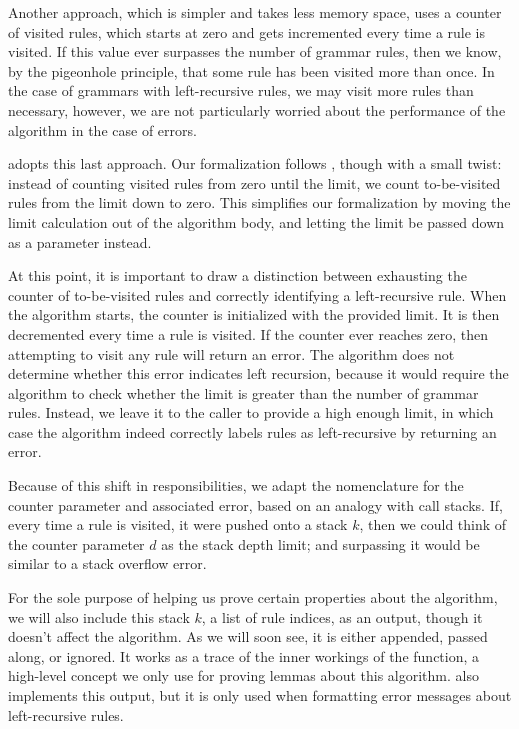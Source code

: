 Another approach,
which is simpler and takes less memory space,
uses a counter of visited rules,
which starts at zero
and gets incremented every time a rule is visited.
If this value ever surpasses the number of grammar rules,
then we know, by the pigeonhole principle,
that some rule has been visited more than once.
In the case of grammars with left-recursive rules,
we may visit more rules than necessary,
however, we are not particularly worried
about the performance of the algorithm
in the case of errors.

\lpeg{} adopts this last approach.
Our formalization follows \lpeg{},
though with a small twist:
instead of counting visited rules from zero until the limit,
we count to-be-visited rules from the limit down to zero.
This simplifies our formalization
by moving the limit calculation out of the algorithm body,
and letting the limit be passed down as a parameter instead.

At this point,
it is important to draw a distinction between
exhausting the counter of to-be-visited rules
and correctly identifying a left-recursive rule.
When the algorithm starts,
the counter is initialized with the provided limit.
It is then decremented every time a rule is visited.
If the counter ever reaches zero,
then attempting to visit any rule
will return an error.
The algorithm does not determine
whether this error indicates left recursion,
because it would require the algorithm to check
whether the limit is greater than the number of grammar rules.
Instead, we leave it to the caller
to provide a high enough limit,
in which case the algorithm indeed
correctly labels rules as left-recursive
by returning an error.

Because of this shift in responsibilities,
we adapt the nomenclature
for the counter parameter and associated error,
based on an analogy with call stacks.
If, every time a rule is visited, it were pushed onto a stack $k$,
then we could think of the counter parameter $d$ as the stack depth limit;
and surpassing it would be similar to a stack overflow error.

For the sole purpose of helping us prove certain properties about the algorithm,
we will also include this stack $k$, a list of rule indices, as an output,
though it doesn't affect the algorithm.
As we will soon see, it is either appended, passed along, or ignored.
It works as a trace of the inner workings of the function,
a high-level concept we only use for proving lemmas about this algorithm.
\lpeg{} also implements this output, but it is only used
when formatting error messages about left-recursive rules.

